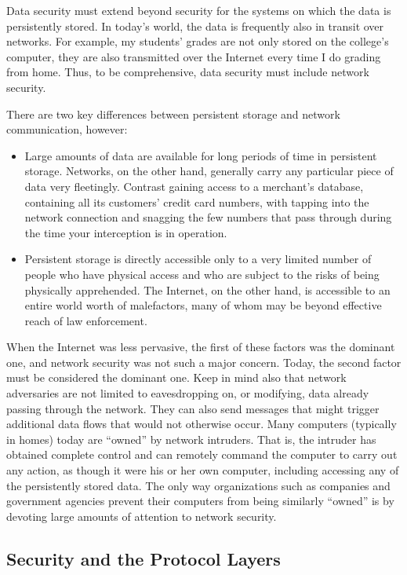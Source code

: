 Data security must extend beyond security for the systems on which
the data is persistently stored.  In today's world, the data is frequently also in transit
over networks.  For example, my students' grades are not only stored
on the college's computer, they are also transmitted over the Internet
every time I do grading from home.  Thus, to be comprehensive, data
security must include network security.

There are two key differences between persistent storage and network
communication, however:
\begin{itemize}
\item
Large amounts of data are available for long periods of time in
persistent storage.  Networks, on the other hand, generally carry any
particular piece of data very fleetingly.  Contrast gaining access to
a merchant's database, containing all its customers' credit card
numbers, with tapping into the network connection and snagging the few
numbers that pass through during the time your interception is in
operation.
\item
Persistent storage is directly accessible only to a very limited
number of people who have physical access and who are subject to the
risks of being physically apprehended.  The Internet, on the other
hand, is accessible to an entire world worth of malefactors, many of
whom may be beyond effective reach of law enforcement.
\end{itemize}

When the Internet was less pervasive, the first of these factors was
the dominant one, and network security was not such a major concern.
Today, the second factor must be considered the dominant one.  Keep in
mind also that network adversaries are not limited to eavesdropping on,
or modifying, data already passing through the network.  They can also
send messages that might trigger additional data flows that would not
otherwise occur.  Many computers (typically in homes) today are
``owned'' by network intruders.  That is, the intruder has obtained
complete control and can remotely command the computer to carry out
any action, as though it were his or her own computer, including
accessing any of the persistently stored data.  The only way
organizations such as companies and government agencies prevent their
computers from being similarly ``owned'' is by devoting large amounts
of attention to network security.

\subsection{Security and the Protocol Layers}

